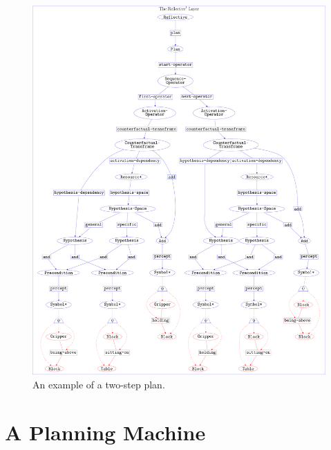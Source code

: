 \begin{figure}
\hspace*{-2cm}\includegraphics[width=18cm]{gfx/example_plan}
\caption[An example of a two-step plan.]{An example of a two-step
  plan.}
\label{figure:example_plan}
\end{figure}

\section{A Planning Machine}

